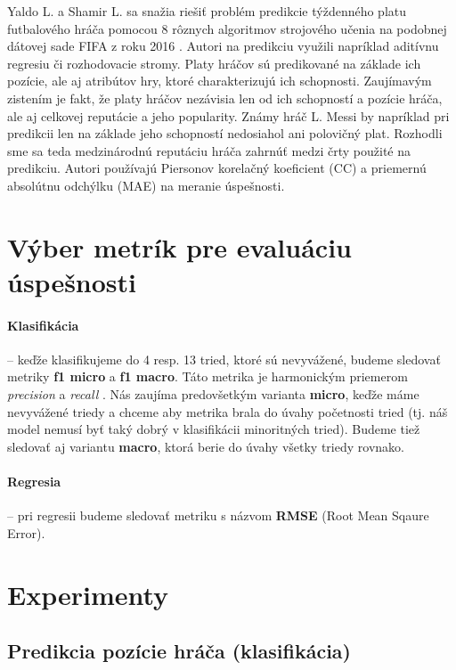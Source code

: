 \documentclass[runningheads]{llncs}
\begin{document}
Yaldo L. a Shamir L. sa snažia riešiť problém predikcie týždenného platu futbalového hráča pomocou 8 rôznych algoritmov strojového učenia na podobnej dátovej sade FIFA z roku 2016 \cite{yaldo2017}. Autori na predikciu využili napríklad aditívnu regresiu či rozhodovacie stromy. Platy hráčov sú predikované na základe ich pozície, ale aj atribútov hry, ktoré charakterizujú ich schopnosti.
Zaujímavým zistením je fakt, že platy hráčov nezávisia len od ich schopností a pozície hráča, ale aj celkovej reputácie a jeho popularity. Známy hráč L. Messi by napríklad pri predikcii len na základe jeho schopností nedosiahol ani polovičný plat. Rozhodli sme sa teda medzinárodnú reputáciu hráča zahrnúť medzi črty použité na predikciu.
Autori používajú Piersonov korelačný koeficient (CC) a priemernú absolútnu odchýlku (MAE) na meranie úspešnosti.


\section{Výber metrík pre evaluáciu úspešnosti}

\paragraph{Klasifikácia} -- keďže klasifikujeme do 4 resp. 13 tried, ktoré sú nevyvážené, budeme sledovať metriky \textbf{f1 micro} a \textbf{f1 macro}.
Táto metrika je harmonickým priemerom \textit{precision} a \textit{recall} \cite{opitz2019macro}.
Nás zaujíma predovšetkým varianta \textbf{micro}, keďže máme nevyvážené triedy a chceme aby metrika brala do úvahy početnosti tried (tj. náš model nemusí byť taký dobrý v klasifikácii minoritných tried). Budeme tiež sledovať aj variantu \textbf{macro}, ktorá berie do úvahy všetky triedy rovnako.

\paragraph{Regresia} -- pri regresii budeme sledovať metriku s názvom \textbf{RMSE} (Root Mean Sqaure Error).

\section{Experimenty}

\subsection{Predikcia pozície hráča (klasifikácia)}
\end{document}
